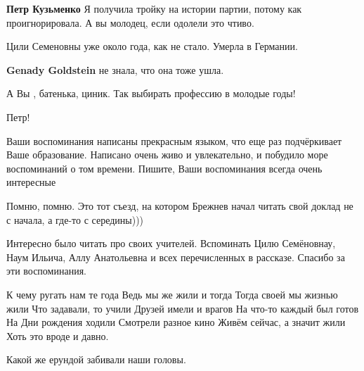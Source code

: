 \begin{itemize}
\begin{itemize}
\begin{itemize} %
\textbf{Петр Кузьменко} Я получила тройку на истории партии, потому как проигнорировала. А вы молодец, если одолели это чтиво.
\end{itemize} %

\end{itemize} %

Цили Семеновны уже около года, как не стало. Умерла в Германии.

\textbf{Genady Goldstein} не знала, что она тоже ушла.

А Вы , батенька, циник. Так выбирать профессию в молодые годы!

Петр!

Ваши воспоминания написаны прекрасным языком, что еще раз подчёркивает Ваше
образование. Написано очень живо и увлекательно, и побудило море воспоминаний о
том времени. Пишите, Ваши воспоминания всегда очень интересные

Помню, помню. Это тот съезд, на котором Брежнев начал читать свой доклад не с начала, а где-то с середины)))


Интересно было читать про своих учителей. Вспоминать Цилю Семёновнау, Наум
Ильича, Аллу Анатольевна и всех перечисленных в рассказе. Спасибо за эти
воспоминания.


\obeycr
К чему ругать нам те года
Ведь мы же жили и тогда
Тогда своей мы жизнью жили
Что задавали, то учили
Друзей имели и врагов
На что-то каждый был готов
На Дни рождения ходили
Смотрели разное кино
Живём сейчас, а значит жили
Хоть это вроде и давно.
\restorecr


Какой же ерундой забивали наши головы.

\end{itemize} %
